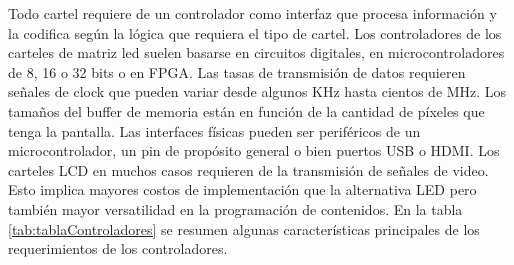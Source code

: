 Todo cartel requiere de un controlador como interfaz que procesa información y la codifica según la lógica que requiera el tipo de cartel. Los controladores de los carteles de matriz led suelen basarse en circuitos digitales, en microcontroladores de 8, 16 o 32 bits o en FPGA. Las tasas de transmisión de datos requieren señales de clock que pueden variar desde algunos KHz hasta cientos de MHz. Los tamaños del buffer de memoria están en función de la cantidad de píxeles que tenga la pantalla. Las interfaces físicas pueden ser periféricos de un microcontrolador, un pin de propósito general o bien puertos USB o HDMI. Los carteles LCD en muchos casos requieren de la transmisión de señales de video. Esto implica mayores costos de implementación que la alternativa LED pero también mayor versatilidad en la programación de contenidos. En la tabla \ref{tab:tablaControladores} se resumen algunas características principales de los requerimientos de los controladores.\\




